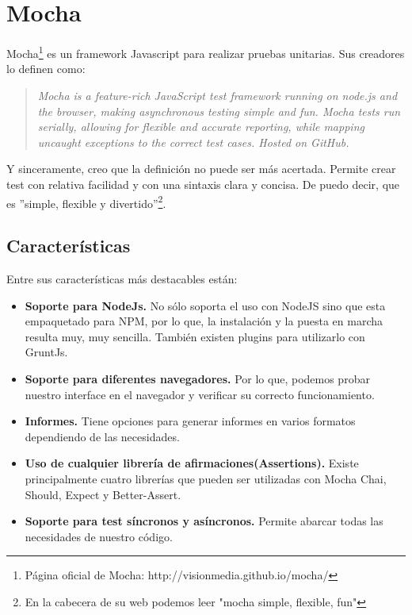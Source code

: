 
\section{Mocha}

Mocha\footnote{Página oficial de Mocha: http://visionmedia.github.io/mocha/} es un framework Javascript para realizar pruebas unitarias. Sus creadores lo definen como:

\begin{quote}
\textit{Mocha is a feature-rich JavaScript test framework running on node.js and the browser, making asynchronous testing simple and fun. Mocha tests run serially, allowing for flexible and accurate reporting, while mapping uncaught exceptions to the correct test cases. Hosted on GitHub.}
\end{quote}


Y sinceramente, creo que la definición no puede ser más acertada. Permite crear test con relativa facilidad y con una sintaxis clara y concisa. De puedo decir, que es ''simple, flexible y divertido''\footnote{En la cabecera de su web podemos leer "mocha simple, flexible, fun"}.


\subsection{Características}

Entre sus características más destacables están:


\begin{itemize}
\item \textbf{Soporte para NodeJs.} No sólo soporta el uso con NodeJS sino que esta empaquetado para NPM, por lo que, la instalación y la puesta en marcha resulta muy, muy sencilla. También existen plugins para utilizarlo con GruntJs.
\item \textbf{Soporte para diferentes navegadores.} Por lo que, podemos probar nuestro interface en el navegador y verificar su correcto funcionamiento.
\item \textbf{Informes.} Tiene opciones para generar informes en varios formatos dependiendo de las necesidades.
\item \textbf{Uso de cualquier librería de afirmaciones(Assertions).} Existe principalmente cuatro librerías que pueden ser utilizadas con Mocha Chai, Should, Expect y Better-Assert.
\item \textbf{Soporte para test síncronos y asíncronos.} Permite abarcar todas las necesidades de nuestro código.
\end{itemize}

